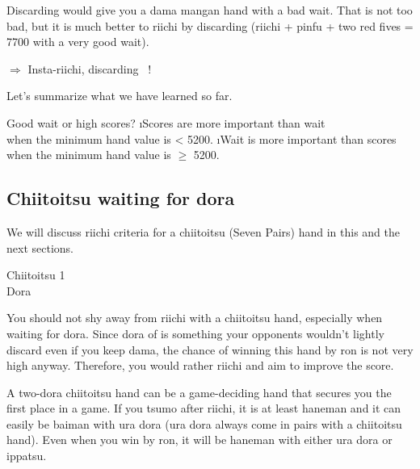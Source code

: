 \noindent Discarding {\LARGE{}} would give you a {\jap dama mangan} hand with a bad wait. That is not too bad, but it is much better to riichi by discarding {\LARGE{}} (riichi + {\jap pinfu} + two red fives = 7700 with a very good wait). 

\begin{center}
{\Large $\Rightarrow$ Insta-riichi, discarding  ~!}
\end{center}

\bigskip

\noindent Let's summarize what we have learned so far. 

\bigskip

\begin{itembox}[c]{Good wait or high scores?}
\bi
\i Scores are more important than wait\\when the minimum hand value is < 5200.
\i Wait is more important than scores\\when the minimum hand value is $\geq$ 5200.
\ei
\end{itembox}

\newpage
\subsection{{\jap Chiitoitsu} waiting for {\jap dora}}
We will discuss riichi criteria for a {\jap chiitoitsu} (Seven Pairs) hand in this and the next sections. 

\bigskip
\begin{itembox}[r]{{\jap Chiitoitsu 1}}
\bp
{}\zhong\zhong\fa\fa~~\\
\hfill\footnotesize{{\jap Dora}~~~~~~~}
\ep
\vspace{-15pt}
\end{itembox}

\noindent You should not shy away from riichi with a {\jap chiitoitsu} hand, especially when waiting for {\jap dora}. Since {\jap dora} of {\LARGE {}} is something your opponents wouldn't lightly discard even if you keep {\jap dama}, the chance of winning this hand by {\jap ron} is not very high anyway. Therefore, you would rather riichi and aim to improve the score. 

\bigskip
A two-{\jap dora} {\jap chiitoitsu} hand can be a game-deciding hand that secures you the first place in a game. If you {\jap tsumo} after riichi, it is at least {\jap haneman} and it can easily be {\jap baiman} with {\jap ura dora} ({\jap ura dora} always come in pairs with a {\jap chiitoitsu} hand). Even when you win by {\jap ron}, it will be {\jap haneman} with either {\jap ura dora} or {\jap ippatsu}. 


